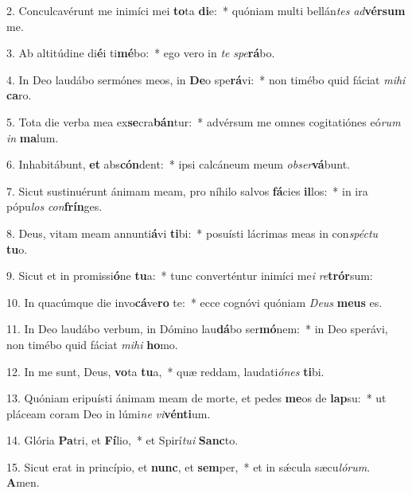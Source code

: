 2. Conculcavérunt me inimíci mei \textbf{to}ta \textbf{di}e:~*  quóniam multi bellán\textit{tes} \textit{ad}\textbf{vér}\textbf{sum} me.\

3. Ab altitúdine di\textbf{é}i ti\textbf{mé}bo:~*  ego vero in \textit{te} \textit{spe}\textbf{rá}bo.\

4. In Deo laudábo sermónes meos, in \textbf{De}o spe\textbf{rá}vi:~*  non timébo quid fáciat \textit{mi}\textit{hi} \textbf{ca}ro.\

5. Tota die verba mea ex\textbf{se}cra\textbf{bán}tur:~*  advérsum me omnes cogitatiónes eó\textit{rum} \textit{in} \textbf{ma}lum.\

6. Inhabitábunt, \textbf{et} abs\textbf{cón}dent:~*  ipsi calcáneum meum \textit{ob}\textit{ser}\textbf{vá}bunt.\

7. Sicut sustinuérunt ánimam meam, pro níhilo salvos \textbf{fá}cies \textbf{il}los:~*  in ira pópu\textit{los} \textit{con}\textbf{frín}ges.\

8. Deus, vitam meam annunti\textbf{á}vi \textbf{ti}bi:~*  posuísti lácrimas meas in con\textit{spéc}\textit{tu} \textbf{tu}o.\

9. Sicut et in promissi\textbf{ó}ne \textbf{tu}a:~*  tunc converténtur inimíci me\textit{i} \textit{re}\textbf{trór}sum:\

10. In quacúmque die invo\textbf{cá}ve\textbf{ro} te:~*  ecce cognóvi quóniam \textit{De}\textit{us} \textbf{me}\textbf{us} es.\

11. In Deo laudábo verbum, in Dómino lau\textbf{dá}bo ser\textbf{mó}nem:~*  in Deo sperávi, non timébo quid fáciat \textit{mi}\textit{hi} \textbf{ho}mo.\

12. In me sunt, Deus, \textbf{vo}ta \textbf{tu}a,~*  quæ reddam, laudati\textit{ó}\textit{nes} \textbf{ti}bi.\

13. Quóniam eripuísti ánimam meam de morte, et pedes \textbf{me}os de \textbf{lap}su:~*  ut pláceam coram Deo in lúmi\textit{ne} \textit{vi}\textbf{vén}\textbf{ti}um.\

14. Glória \textbf{Pa}tri, et \textbf{Fí}lio,~*  et Spirí\textit{tu}\textit{i} \textbf{Sanc}to.\

15. Sicut erat in princípio, et \textbf{nunc}, et \textbf{sem}per,~*  et in sǽcula sæcu\textit{ló}\textit{rum}. \textbf{A}men.\

